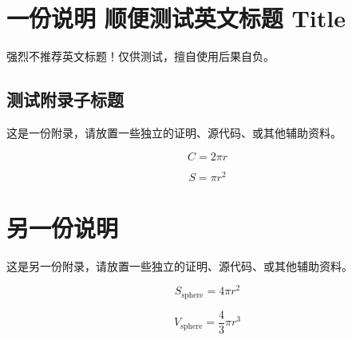 \documentclass[lang=chs, degree=phd, blindreview=false, winfonts=true]{yanputhesis}
\begin{document}
\cleardoublepage
\appendix
\chapter{一份说明 顺便测试英文标题 Title}

强烈不推荐英文标题！仅供测试，擅自使用后果自负。

\section{测试附录子标题}

这是一份附录，请放置一些独立的证明、源代码、或其他辅助资料。


\begin{equation}
    C = 2 \pi r
\end{equation}

\begin{equation}
    S = \pi r^2
\end{equation}

\cleardoublepage

\chapter{另一份说明}

这是另一份附录，请放置一些独立的证明、源代码、或其他辅助资料。


\begin{equation}
    S_{\text{sphere}} = 4 \pi r^2
\end{equation}

\begin{equation}
    V_{\text{sphere}} = \frac43 \pi r^3
\end{equation}
\end{document}
